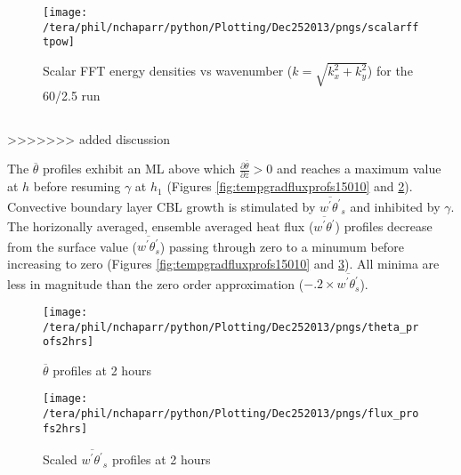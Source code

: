 \begin{figure}[htbp]
    \centering
    \texttt{[image: /tera/phil/nchaparr/python/Plotting/Dec252013/pngs/scalarfftpow]}
    \caption{Scalar FFT  energy densities vs wavenumber ($k = \sqrt{k_{x}^{2}+k_{y}^{2}}$) for the 60/2.5 run}
    \label{fig:2fftw602point5}   %
\end{figure}

\clearpage

\subsection{}%
>>>>>>> added discussion
\FloatBarrier

The $\overline{\theta}$ profiles exhibit an \acs{ML} above which  $\frac{\partial\overline{\theta}}{\partial z}>0$ 
and reaches a maximum value at $h$ before resuming $\gamma$  at $h_{1}$ 
(Figures \ref{fig:tempgradfluxprofs15010} and \ref{fig:pottempprofs2hrs}).  Convective boundary layer \acs{CBL} growth is stimulated 
by $\overline{w^{'}\theta^{'}}_{s}$ and inhibited by $\gamma$.\\

The horizonally averaged, ensemble averaged heat flux ($\overline{w^{'}\theta^{'}}$) profiles decrease 
from the surface value ($\overline{w^{'}\theta^{'}_{s}}$) passing through zero to a minumum before 
increasing to zero (Figures \ref{fig:tempgradfluxprofs15010} and  \ref{fig:fluxprofs2hrs}).  All minima are 
less  in magnitude than the zero order approximation ($-.2 \times \overline{w^{'}\theta^{'}_{s}}$).\\


\begin{figure}[htbp]
    \centering
    \texttt{[image: /tera/phil/nchaparr/python/Plotting/Dec252013/pngs/theta\_profs2hrs]}
    \caption{$\overline{\theta}$ profiles at 2 hours}
    \label{fig:pottempprofs2hrs}   %
\end{figure}

\begin{figure}[htbp]
    \centering
    \texttt{[image: /tera/phil/nchaparr/python/Plotting/Dec252013/pngs/flux\_profs2hrs]}
    \caption{Scaled $\overline{w^{'}\theta^{'}}_{s}$ profiles at 2 hours}
    \label{fig:fluxprofs2hrs}   %
\end{figure}

